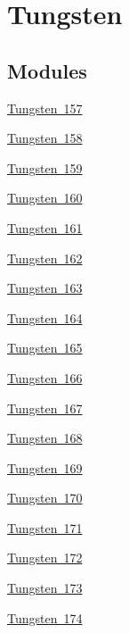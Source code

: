 \hypertarget{group___isotope_const-_tungsten}{}\section{Tungsten}
\label{group___isotope_const-_tungsten}
\subsection*{Modules}
\begin{DoxyCompactItemize}
\item 
\mbox{\hyperlink{group___isotope_const-_tungsten-_w157}{Tungsten 157}}
\item 
\mbox{\hyperlink{group___isotope_const-_tungsten-_w158}{Tungsten 158}}
\item 
\mbox{\hyperlink{group___isotope_const-_tungsten-_w159}{Tungsten 159}}
\item 
\mbox{\hyperlink{group___isotope_const-_tungsten-_w160}{Tungsten 160}}
\item 
\mbox{\hyperlink{group___isotope_const-_tungsten-_w161}{Tungsten 161}}
\item 
\mbox{\hyperlink{group___isotope_const-_tungsten-_w162}{Tungsten 162}}
\item 
\mbox{\hyperlink{group___isotope_const-_tungsten-_w163}{Tungsten 163}}
\item 
\mbox{\hyperlink{group___isotope_const-_tungsten-_w164}{Tungsten 164}}
\item 
\mbox{\hyperlink{group___isotope_const-_tungsten-_w165}{Tungsten 165}}
\item 
\mbox{\hyperlink{group___isotope_const-_tungsten-_w166}{Tungsten 166}}
\item 
\mbox{\hyperlink{group___isotope_const-_tungsten-_w167}{Tungsten 167}}
\item 
\mbox{\hyperlink{group___isotope_const-_tungsten-_w168}{Tungsten 168}}
\item 
\mbox{\hyperlink{group___isotope_const-_tungsten-_w169}{Tungsten 169}}
\item 
\mbox{\hyperlink{group___isotope_const-_tungsten-_w170}{Tungsten 170}}
\item 
\mbox{\hyperlink{group___isotope_const-_tungsten-_w171}{Tungsten 171}}
\item 
\mbox{\hyperlink{group___isotope_const-_tungsten-_w172}{Tungsten 172}}
\item 
\mbox{\hyperlink{group___isotope_const-_tungsten-_w173}{Tungsten 173}}
\item 
\mbox{\hyperlink{group___isotope_const-_tungsten-_w174}{Tungsten 174}}

\end{DoxyCompactItemize}

